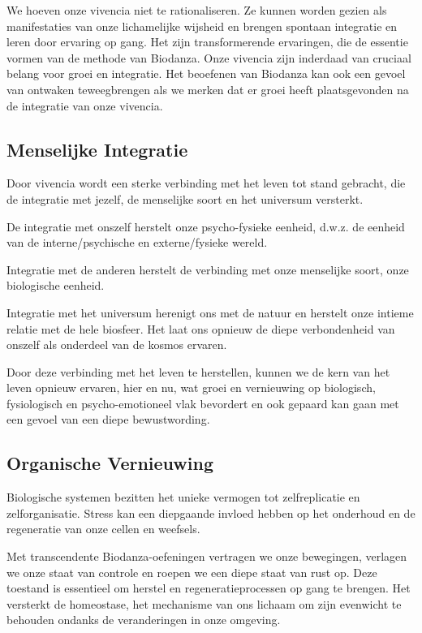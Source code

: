 \documentclass[
  11pt,
]{book}
\begin{document}
We hoeven onze vivencia niet te rationaliseren. Ze kunnen worden gezien als manifestaties van onze lichamelijke wijsheid en brengen spontaan integratie en leren door ervaring op gang. Het zijn transformerende ervaringen, die de essentie vormen van de methode van Biodanza. Onze vivencia zijn inderdaad van cruciaal belang voor groei en integratie. Het beoefenen van Biodanza kan ook een gevoel van ontwaken teweegbrengen als we merken dat er groei heeft plaatsgevonden na de integratie van onze vivencia.

\hypertarget{menselijke-integratie}{%
\subsection{Menselijke Integratie}\label{menselijke-integratie}}

Door vivencia wordt een sterke verbinding met het leven tot stand gebracht, die de integratie met jezelf, de menselijke soort en het universum versterkt.

De integratie met onszelf herstelt onze psycho-fysieke eenheid, d.w.z. de eenheid van de interne/psychische en externe/fysieke wereld.

Integratie met de anderen herstelt de verbinding met onze menselijke soort, onze biologische eenheid.

Integratie met het universum herenigt ons met de natuur en herstelt onze intieme relatie met de hele biosfeer. Het laat ons opnieuw de diepe verbondenheid van onszelf als onderdeel van de kosmos ervaren.

Door deze verbinding met het leven te herstellen, kunnen we de kern van het leven opnieuw ervaren, hier en nu, wat groei en vernieuwing op biologisch, fysiologisch en psycho-emotioneel vlak bevordert en ook gepaard kan gaan met een gevoel van een diepe bewustwording.

\hypertarget{organische-vernieuwing}{%
\subsection{Organische Vernieuwing}\label{organische-vernieuwing}}

Biologische systemen bezitten het unieke vermogen tot zelfreplicatie en zelforganisatie. Stress kan een diepgaande invloed hebben op het onderhoud en de regeneratie van onze cellen en weefsels.

Met transcendente Biodanza-oefeningen vertragen we onze bewegingen, verlagen we onze staat van controle en roepen we een diepe staat van rust op. Deze toestand is essentieel om herstel en regeneratieprocessen op gang te brengen. Het versterkt de homeostase, het mechanisme van ons lichaam om zijn evenwicht te behouden ondanks de veranderingen in onze omgeving.
\end{document}
